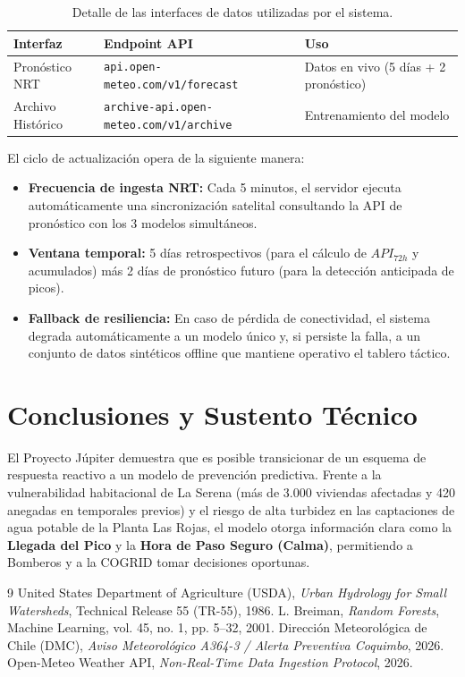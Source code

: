 \documentclass[11pt,a4paper]{article}
\begin{document}
\begin{table}[htbp]
\centering
\caption{Detalle de las interfaces de datos utilizadas por el sistema.}
\vspace{0.2cm}
\begin{tabular}{@{}lll@{}}
\toprule
\textbf{Interfaz} & \textbf{Endpoint API} & \textbf{Uso} \\ \midrule
Pronóstico NRT & \texttt{api.open-meteo.com/v1/forecast} & Datos en vivo (5 días + 2 pronóstico) \\
Archivo Histórico & \texttt{archive-api.open-meteo.com/v1/archive} & Entrenamiento del modelo \\ \bottomrule
\end{tabular}
\label{tab:endpoints}
\end{table}

El ciclo de actualización opera de la siguiente manera:

\begin{itemize}
    \item \textbf{Frecuencia de ingesta NRT:} Cada 5 minutos, el servidor ejecuta automáticamente una sincronización satelital consultando la API de pronóstico con los 3 modelos simultáneos.
    \item \textbf{Ventana temporal:} 5 días retrospectivos (para el cálculo de $API_{72h}$ y acumulados) más 2 días de pronóstico futuro (para la detección anticipada de picos).
    \item \textbf{Fallback de resiliencia:} En caso de pérdida de conectividad, el sistema degrada automáticamente a un modelo único y, si persiste la falla, a un conjunto de datos sintéticos offline que mantiene operativo el tablero táctico.
\end{itemize}

\section{Conclusiones y Sustento Técnico}

El Proyecto Júpiter demuestra que es posible transicionar de un esquema de respuesta reactivo a un modelo de prevención predictiva. Frente a la vulnerabilidad habitacional de La Serena (más de 3.000 viviendas afectadas y 420 anegadas en temporales previos) y el riesgo de alta turbidez en las captaciones de agua potable de la Planta Las Rojas, el modelo otorga información clara como la \textbf{Llegada del Pico} y la \textbf{Hora de Paso Seguro (Calma)}, permitiendo a Bomberos y a la COGRID tomar decisiones oportunas.

\begin{thebibliography}{9}
 United States Department of Agriculture (USDA), \textit{Urban Hydrology for Small Watersheds}, Technical Release 55 (TR-55), 1986.
 L. Breiman, \textit{Random Forests}, Machine Learning, vol. 45, no. 1, pp. 5--32, 2001.
 Dirección Meteorológica de Chile (DMC), \textit{Aviso Meteorológico A364-3 / Alerta Preventiva Coquimbo}, 2026.
 Open-Meteo Weather API, \textit{Non-Real-Time Data Ingestion Protocol}, 2026.
\end{thebibliography}
\end{document}
